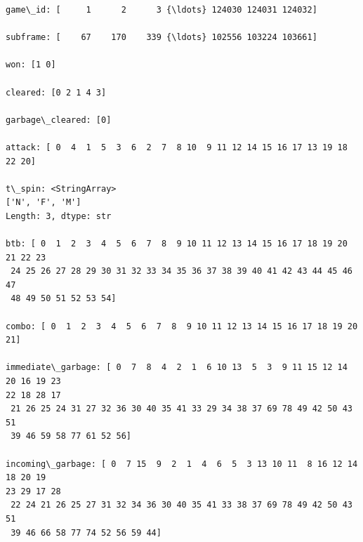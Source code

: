 \documentclass[11pt]{article}
\begin{document}
    \begin{Verbatim}[commandchars=\\\{\}]
game\_id: [     1      2      3 {\ldots} 124030 124031 124032]

subframe: [    67    170    339 {\ldots} 102556 103224 103661]

won: [1 0]

cleared: [0 2 1 4 3]

garbage\_cleared: [0]

attack: [ 0  4  1  5  3  6  2  7  8 10  9 11 12 14 15 16 17 13 19 18 22 20]

t\_spin: <StringArray>
['N', 'F', 'M']
Length: 3, dtype: str

btb: [ 0  1  2  3  4  5  6  7  8  9 10 11 12 13 14 15 16 17 18 19 20 21 22 23
 24 25 26 27 28 29 30 31 32 33 34 35 36 37 38 39 40 41 42 43 44 45 46 47
 48 49 50 51 52 53 54]

combo: [ 0  1  2  3  4  5  6  7  8  9 10 11 12 13 14 15 16 17 18 19 20 21]

immediate\_garbage: [ 0  7  8  4  2  1  6 10 13  5  3  9 11 15 12 14 20 16 19 23
22 18 28 17
 21 26 25 24 31 27 32 36 30 40 35 41 33 29 34 38 37 69 78 49 42 50 43 51
 39 46 59 58 77 61 52 56]

incoming\_garbage: [ 0  7 15  9  2  1  4  6  5  3 13 10 11  8 16 12 14 18 20 19
23 29 17 28
 22 24 21 26 25 27 31 32 34 36 30 40 35 41 33 38 37 69 78 49 42 50 43 51
 39 46 66 58 77 74 52 56 59 44]


\end{Verbatim}
\end{document}
